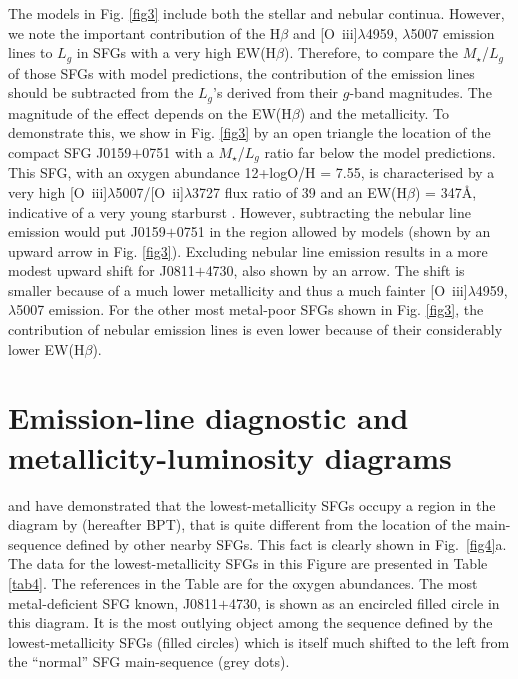 \documentclass[useAMS,usenatbib]{mn2e}
\begin{document}
The models in Fig. \ref{fig3} include both the stellar and nebular
continua. However, we note the important contribution of the 
H$\beta$ and [O~{\sc iii}]$\lambda$4959, $\lambda$5007 emission lines to  
$L_g$ in SFGs with a very high EW(H$\beta$). Therefore, to compare the $M_\star$/$L_g$ of those SFGs with model predictions, the contribution of the emission
lines should be subtracted from the $L_g$'s derived from 
their $g$-band magnitudes. The magnitude of the effect depends on the EW(H$\beta$) and the
metallicity. To demonstrate this, we show in Fig. \ref{fig3} by an open
triangle the location of the compact SFG J0159$+$0751 with a $M_\star$/$L_g$
ratio far below the model predictions. This SFG, with an 
oxygen abundance 12+logO/H = 7.55, is characterised by
a very high [O~{\sc iii}]$\lambda$5007/[O~{\sc ii}]$\lambda$3727 flux
ratio of 39 and an EW(H$\beta$) = 347\AA, indicative of  a very young starburst 
\citep*{I17}. However, subtracting the nebular line emission would put J0159$+$0751
in the region allowed by models (shown by an upward arrow in Fig. \ref{fig3}). 
Excluding nebular line emission results in a more modest upward
shift for J0811$+$4730, also shown by an arrow. The shift is smaller because of
a much lower metallicity and thus a much fainter 
[O~{\sc iii}]$\lambda$4959, $\lambda$5007 emission. For the other most 
metal-poor
SFGs shown in Fig. \ref{fig3}, the contribution of nebular emission lines is
even lower because of their considerably lower EW(H$\beta$).



\section{Emission-line diagnostic and metallicity-luminosity diagrams}
\label{sec:diagrams}

\citet{I12} and \citet{G17} have demonstrated that the lowest-metallicity
SFGs occupy a region in the diagram by \citet*{BPT81} (hereafter BPT), that is 
quite different from the location of the 
main-sequence defined by other nearby SFGs. 
This fact is clearly shown in Fig.~\ref{fig4}a.
The data for the lowest-metallicity SFGs in this Figure are 
presented in Table \ref{tab4}. The references in the Table are for the
oxygen abundances.
The most metal-deficient SFG known, 
J0811$+$4730, is shown as an encircled filled circle in this diagram.
It is the most outlying
object among the sequence defined by the lowest-metallicity SFGs 
(filled circles) which is itself much shifted to the left from the ``normal'' 
SFG main-sequence (grey dots).  
\end{document}
